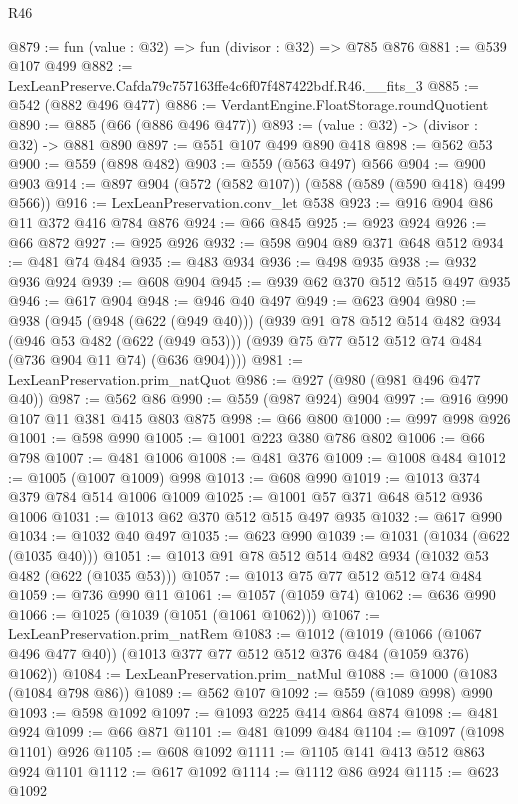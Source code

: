 \begin{lexlean}{R46}
\begin{coremodule}
@879 := fun (value : @32) => fun (divisor : @32) => @785 @876
@881 := @539 @107 @499
@882 := LexLeanPreserve.Cafda79c757163ffe4c6f07f487422bdf.R46.__fits_3
@885 := @542 (@882 @496 @477)
@886 := VerdantEngine.FloatStorage.roundQuotient
@890 := @885 (@66 (@886 @496 @477))
@893 := (value : @32) -> (divisor : @32) -> @881 @890
@897 := @551 @107 @499 @890 @418
@898 := @562 @53
@900 := @559 (@898 @482)
@903 := @559 (@563 @497) @566
@904 := @900 @903
@914 := @897 @904 (@572 (@582 @107)) (@588 (@589 (@590 @418) @499 @566))
@916 := LexLeanPreservation.conv_let @538
@923 := @916 @904 @86 @11 @372 @416 @784 @876
@924 := @66 @845
@925 := @923 @924
@926 := @66 @872
@927 := @925 @926
@932 := @598 @904 @89 @371 @648 @512
@934 := @481 @74 @484
@935 := @483 @934
@936 := @498 @935
@938 := @932 @936 @924
@939 := @608 @904
@945 := @939 @62 @370 @512 @515 @497 @935
@946 := @617 @904
@948 := @946 @40 @497
@949 := @623 @904
@980 := @938
    (@945
      (@948 (@622 (@949 @40)))
      (@939
        @91
        @78
        @512
        @514
        @482
        @934
        (@946 @53 @482 (@622 (@949 @53)))
        (@939 @75 @77 @512 @512 @74 @484 (@736 @904 @11 @74) (@636 @904))))
@981 := LexLeanPreservation.prim_natQuot
@986 := @927 (@980 (@981 @496 @477 @40))
@987 := @562 @86
@990 := @559 (@987 @924) @904
@997 := @916 @990 @107 @11 @381 @415 @803 @875
@998 := @66 @800
@1000 := @997 @998 @926
@1001 := @598 @990
@1005 := @1001 @223 @380 @786 @802
@1006 := @66 @798
@1007 := @481 @1006
@1008 := @481 @376
@1009 := @1008 @484
@1012 := @1005 (@1007 @1009) @998
@1013 := @608 @990
@1019 := @1013 @374 @379 @784 @514 @1006 @1009
@1025 := @1001 @57 @371 @648 @512 @936 @1006
@1031 := @1013 @62 @370 @512 @515 @497 @935
@1032 := @617 @990
@1034 := @1032 @40 @497
@1035 := @623 @990
@1039 := @1031 (@1034 (@622 (@1035 @40)))
@1051 := @1013 @91 @78 @512 @514 @482 @934 (@1032 @53 @482 (@622 (@1035 @53)))
@1057 := @1013 @75 @77 @512 @512 @74 @484
@1059 := @736 @990 @11
@1061 := @1057 (@1059 @74)
@1062 := @636 @990
@1066 := @1025 (@1039 (@1051 (@1061 @1062)))
@1067 := LexLeanPreservation.prim_natRem
@1083 := @1012
    (@1019 (@1066 (@1067 @496 @477 @40)) (@1013 @377 @77 @512 @512 @376 @484 (@1059 @376) @1062))
@1084 := LexLeanPreservation.prim_natMul
@1088 := @1000 (@1083 (@1084 @798 @86))
@1089 := @562 @107
@1092 := @559 (@1089 @998) @990
@1093 := @598 @1092
@1097 := @1093 @225 @414 @864 @874
@1098 := @481 @924
@1099 := @66 @871
@1101 := @481 @1099 @484
@1104 := @1097 (@1098 @1101) @926
@1105 := @608 @1092
@1111 := @1105 @141 @413 @512 @863 @924 @1101
@1112 := @617 @1092
@1114 := @1112 @86 @924
@1115 := @623 @1092

\end{coremodule}
\end{lexlean}
